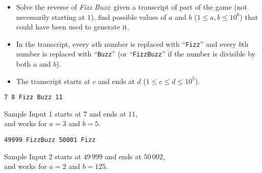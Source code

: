 \begin{frame}
    \frametitle{\problemtitle}

    \begin{columns}
        \begin{column}[T]{.70\textwidth}
            \begin{itemize}
                \item Solve the reverse of \emph{Fizz Buzz}:
                given a transcript of part of the game (not necessarily starting at $1$),
                find possible values of $a$ and $b$ ($1 \leq a,b \leq 10^6$) that could have been used to generate it.
                \item In the transcript, every $a$th number is replaced with ``\texttt{Fizz}''
                and every $b$th number is replaced with ``\texttt{Buzz}''
                (or ``\texttt{FizzBuzz}'' if the number is divisible by both $a$ and $b$).
                \item The transcript starts at $c$ and ends at $d$ ($1 \leq c \leq d \leq 10^5$).
            \end{itemize}

            \vspace{1.5em}

            \centering

            \texttt{7 8 Fizz Buzz 11}
            \vspace{0.5em}

            \small
            Sample Input 1 starts at $7$ and ends at $11$, \\
            and works for $a=3$ and $b=5$.

            \vspace{1.5em}

            \normalsize
            \texttt{49999 FizzBuzz 50001 Fizz}
            \vspace{0.5em}

            \small
            Sample Input 2 starts at $49\,999$ and ends at $50\,002$, \\
            and works for $a=2$ and $b=125$.
        \end{column}

    \end{columns}
\end{frame}
